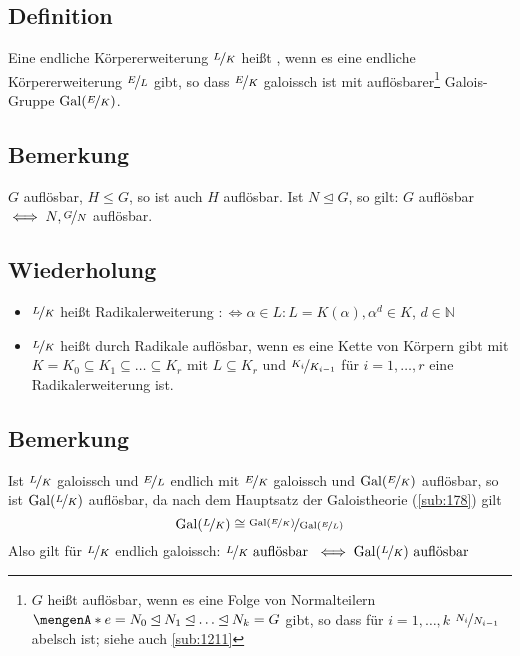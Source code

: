 \subsection[Definition: Auflösbare Körpererweiterung]{Definition} %
\label{sub:21.1}
Eine endliche Körpererweiterung $\nicefrac{L}{K}$ heißt , wenn es eine endliche Körpererweiterung $\nicefrac{E}{L}$ gibt, so dass $\nicefrac{E}{K}$
galoissch ist mit auflösbarer\footnote{$G$ heißt auflösbar, wenn es eine Folge von Normalteilern $\set{e} = N_0 \unlhd N_1 \unlhd \ldots \unlhd N_k =G$ gibt,
so dass für $i=1, \ldots ,k$ $\nicefrac{N_i}{N_{i-1}}$ abelsch ist; siehe auch \ref{sub:1211}} Galois-Gruppe $\operatorname{Gal}(\nicefrac{E}{K})$. 

\subsection[Bemerkung: Untergruppen einer auflösbaren Gruppe sind auflösbar]{Bemerkung} %
\label{sub:21.2}
$G$ auflösbar, $H \le G$, so ist auch $H$ auflösbar. Ist $N \unlhd G$, so gilt: $G$ auflösbar $\iff N, \nicefrac{G}{N}$ auflösbar.

\subsection[Wiederholung: Radikalerweiterungen und durch Radikale auflösbar]{Wiederholung} %
\label{sub:21.3}
\begin{itemize}
	\item $\nicefrac{L}{K}$ heißt Radikalerweiterung $:\Leftrightarrow \alpha \in L : L=K(\alpha), \alpha^d \in K$, $d \in \mathds{N}$
	\item $\nicefrac{L}{K}$ heißt durch Radikale auflösbar, wenn es eine Kette von Körpern gibt mit $K=K_0 \subseteq K_1 \subseteq \ldots \subseteq K_r$ mit 
	$L \subseteq K_r$ und $\nicefrac{K_i}{K_{i-1}}$ für $i=1, \ldots ,r$ eine Radikalerweiterung ist.
\end{itemize}

\subsection[Bemerkung zur Auflösbarkeit von Galoisgruppen]{Bemerkung} %
\label{sub:21.4}
Ist $\nicefrac{L}{K}$ galoissch und $\nicefrac{E}{L}$ endlich mit $\nicefrac{E}{K}$ galoissch und $\operatorname{Gal}(\nicefrac{E}{K})$ auflösbar, so ist $\operatorname{Gal}(\nicefrac{L}{K})$
auflösbar, da nach dem Hauptsatz der Galoistheorie (\ref{sub:178}) gilt
\[
	\operatorname{Gal}(\nicefrac{L}{K}) \cong \nicefrac{\operatorname{Gal}(\nicefrac{E}{K})}{\operatorname{Gal}(\nicefrac{E}{L})}
\]
Also gilt für $\nicefrac{L}{K}$ endlich galoissch: $\nicefrac{L}{K} \text{ auflösbar } \iff \operatorname{Gal}(\nicefrac{L}{K}) \text{ auflösbar}$

